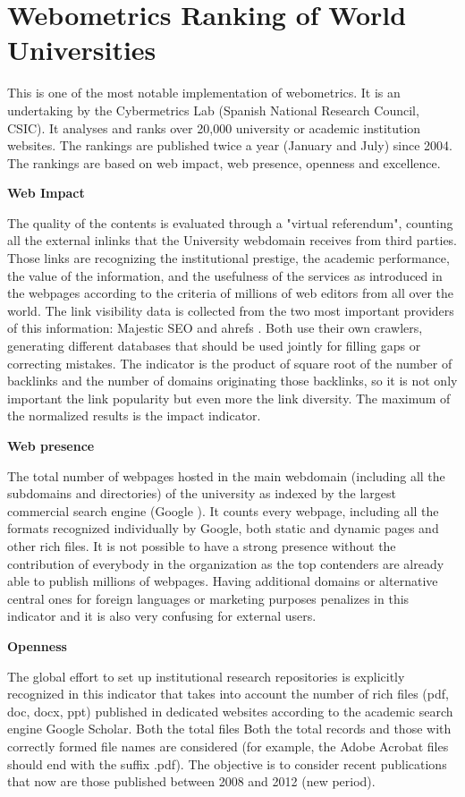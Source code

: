 \section{Webometrics Ranking of World Universities}
\noindent
This is one of the most notable implementation of webometrics. It is an undertaking by the Cybermetrics Lab (Spanish National Research Council, CSIC). It analyses and ranks over 20,000 university or academic institution websites. The rankings are published twice a year (January and July) since 2004. The rankings are based on web impact, web presence, openness and excellence.

\noindent
\textbf{Web Impact}

\noindent
The quality of the contents is evaluated through a "virtual referendum", counting all the external inlinks that the University webdomain receives from third parties. Those links are recognizing the institutional prestige, the academic performance, the value of the information, and the usefulness of the services as introduced in the webpages according to the criteria of millions of web editors from all over the world. The link visibility data is collected from the two most important providers of this information: Majestic SEO and ahrefs . Both use their own crawlers, generating different databases that should be used jointly for filling gaps or correcting mistakes. The indicator is the product of square root of the number of backlinks and the number of domains originating those backlinks, so it is not only important the link popularity but even more the link diversity. The maximum of the normalized results is the impact indicator.

\noindent
\textbf{Web presence}

\noindent
The total number of webpages hosted in the main webdomain (including all the subdomains and directories) of the university as indexed by the largest commercial search engine (Google ). It counts every webpage, including all the formats recognized individually by Google, both static and dynamic pages and other rich files. It is not possible to have a strong presence without the contribution of everybody in the organization as the top contenders are already able to publish millions of webpages. Having additional domains or alternative central ones for foreign languages or marketing purposes penalizes in this indicator and it is also very confusing for external users.

\noindent
\textbf{Openness}

\noindent
The global effort to set up institutional research repositories is explicitly recognized in this indicator that takes into account the number of rich files (pdf, doc, docx, ppt) published in dedicated websites according to the academic search engine Google Scholar. Both the total files Both the total records and those with correctly formed file names are considered (for example, the Adobe Acrobat files should end with the suffix .pdf). The objective is to consider recent publications that now are those published between 2008 and 2012 (new period).

